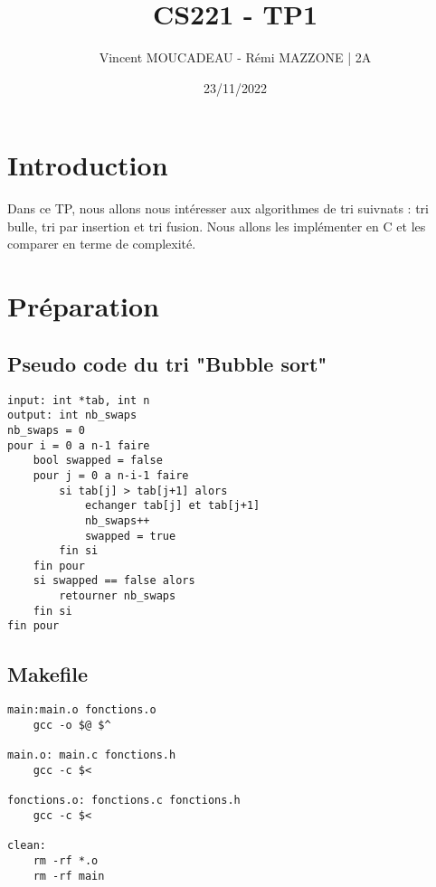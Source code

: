 \documentclass[12pt]{article}
\title{CS221 - TP1}
\author{Vincent MOUCADEAU - Rémi MAZZONE | 2A}
\date{23/11/2022}
\begin{document}
\maketitle

\tableofcontents
\newpage

\section{Introduction}
Dans ce TP, nous allons nous intéresser aux algorithmes de tri suivnats : tri bulle, tri par insertion et tri fusion. Nous allons les implémenter en C et les comparer en terme de complexité. 

\section{Préparation} 
\subsection{Pseudo code du tri "Bubble sort"} 

\begin{lstlisting}[style=pseudoCode, caption=Pseudo code du tri "Bubble sort" optimisé]
input: int *tab, int n
output: int nb_swaps
nb_swaps = 0
pour i = 0 a n-1 faire
    bool swapped = false
    pour j = 0 a n-i-1 faire
        si tab[j] > tab[j+1] alors
            echanger tab[j] et tab[j+1]
            nb_swaps++
            swapped = true
        fin si
    fin pour
    si swapped == false alors
        retourner nb_swaps
    fin si
fin pour
\end{lstlisting} 

\subsection{Makefile} 
\begin{lstlisting}[style=Makefile, caption=Makefile du projet]
main:main.o fonctions.o 
    gcc -o $@ $^

main.o: main.c fonctions.h 
    gcc -c $<

fonctions.o: fonctions.c fonctions.h 
    gcc -c $<

clean: 
    rm -rf *.o 
    rm -rf main
\end{lstlisting} 
\end{document}
